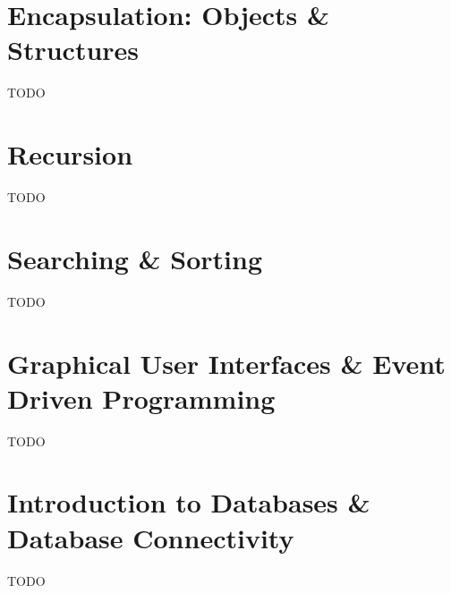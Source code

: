 

\chapter{Encapsulation: Objects \& Structures}
\label{chapter:objects}

TODO
%
%

\chapter{Recursion}

TODO

\chapter{Searching \& Sorting}

TODO

\chapter{Graphical User Interfaces \& Event Driven Programming}
\label{chapter:gui}

TODO

\chapter{Introduction to Databases \& Database Connectivity}

TODO

